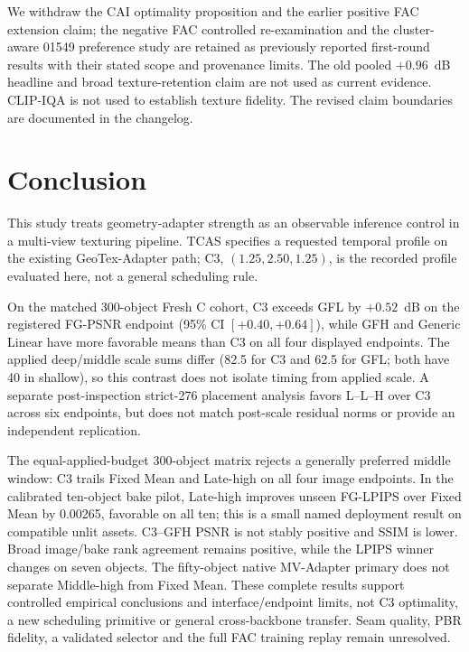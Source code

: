 \documentclass[times,twocolumn,final]{elsarticle}
\begin{document}
We withdraw the CAI optimality proposition and the earlier positive FAC extension claim; the negative FAC controlled re-examination and the cluster-aware 01549 preference study are retained as previously reported first-round results with their stated scope and provenance limits. The old pooled $+0.96$~dB headline and broad texture-retention claim are not used as current evidence. CLIP-IQA is not used to establish texture fidelity. The revised claim boundaries are documented in the changelog.

\section{Conclusion}
\label{sec:conclusion}

This study treats geometry-adapter strength as an observable inference control in a multi-view texturing pipeline. TCAS specifies a requested temporal profile on the existing GeoTex-Adapter path; C3, $(1.25,2.50,1.25)$, is the recorded profile evaluated here, not a general scheduling rule.

On the matched 300-object Fresh C cohort, C3 exceeds GFL by $+0.52$~dB on the registered FG-PSNR endpoint (95\% CI $[+0.40,+0.64]$), while GFH and Generic Linear have more favorable means than C3 on all four displayed endpoints. The applied deep/middle scale sums differ (82.5 for C3 and 62.5 for GFL; both have 40 in shallow), so this contrast does not isolate timing from applied scale. A separate post-inspection strict-276 placement analysis favors L--L--H over C3 across six endpoints, but does not match post-scale residual norms or provide an independent replication.

The equal-applied-budget 300-object matrix rejects a generally preferred middle window: C3 trails Fixed Mean and Late-high on all four image endpoints. In the calibrated ten-object bake pilot, Late-high improves unseen FG-LPIPS over Fixed Mean by 0.00265, favorable on all ten; this is a small named deployment result on compatible unlit assets. C3--GFH PSNR is not stably positive and SSIM is lower. Broad image/bake rank agreement remains positive, while the LPIPS winner changes on seven objects. The fifty-object native MV-Adapter primary does not separate Middle-high from Fixed Mean. These complete results support controlled empirical conclusions and interface/endpoint limits, not C3 optimality, a new scheduling primitive or general cross-backbone transfer. Seam quality, PBR fidelity, a validated selector and the full FAC training replay remain unresolved.
\end{document}

